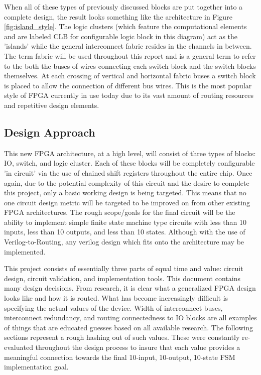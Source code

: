 \documentclass[12pt]{article}
\begin{document}
When all of these types of previously discussed blocks are put together into a complete
design, the result looks something like the architecture in Figure \ref{fig:island_style}.
The logic clusters (which
feature the computational elements and are labeled CLB for configurable logic block in this
 diagram) act as the 'islands' while the general interconnect fabric
resides in the channels in between. The term fabric will be used throughout this report
and is a general term to refer to the both the buses of wires connecting each switch block
and the switch blocks themselves. At each crossing of vertical and horizontal fabric
buses a switch block is placed to allow the connection of different bus wires. This is
the most popular style of FPGA currently in use today due to its vast amount of routing
resources and repetitive design elements.

\subsection{Design Approach}

This new FPGA architecture, at a high level, will consist of three types of blocks:
IO, switch, and logic cluster. Each of these blocks will be completely configurable 'in circuit'
via the use of chained shift registers throughout the entire chip. Once again, due 
to the potential complexity of this circuit and the desire to complete this project,
only a basic working design is being targeted. This means that no one circuit design
metric will be targeted to be improved on from other existing FPGA architectures.
The rough scope/goals for the final circuit will be the ability to implement simple
finite state machine type circuits with less than 10 inputs, less than 10 outputs, and
less than 10 states. Although with the use of Verilog-to-Routing, any verilog design
which fits onto the architecture may be implemented.

This project consists of essentially three parts of equal time and value: circuit 
design, circuit validation, and implementation tools. This document contains many 
design decisions. From research, it is clear what a generalized FPGA design 
looks like and how it is routed. What has become increasingly difficult is specifying 
the actual values of the device. Width of interconnect buses, interconnect redundancy,
and routing connectedness to IO blocks are all examples of things that are educated guesses
based on all available research. The following 
sections represent a rough hashing out of such values. These were constantly 
re-evaluated throughout the design process to insure that each value provides a meaningful 
connection towards the final 10-input, 10-output, 10-state FSM implementation goal.
\end{document}
